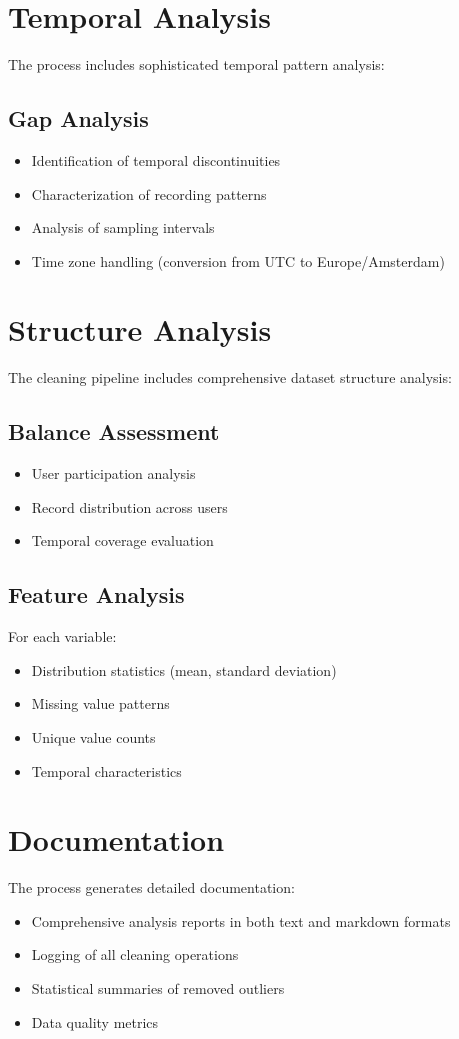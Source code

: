 \documentclass{article}
\begin{document}
\section{Temporal Analysis}
The process includes sophisticated temporal pattern analysis:

\subsection{Gap Analysis}
\begin{itemize}[noitemsep]
\item Identification of temporal discontinuities
\item Characterization of recording patterns
\item Analysis of sampling intervals
\item Time zone handling (conversion from UTC to Europe/Amsterdam)
\end{itemize}

\section{Structure Analysis}
The cleaning pipeline includes comprehensive dataset structure analysis:

\subsection{Balance Assessment}
\begin{itemize}[noitemsep]
\item User participation analysis
\item Record distribution across users
\item Temporal coverage evaluation
\end{itemize}

\subsection{Feature Analysis}
For each variable:
\begin{itemize}[noitemsep]
\item Distribution statistics (mean, standard deviation)
\item Missing value patterns
\item Unique value counts
\item Temporal characteristics
\end{itemize}

\section{Documentation}
The process generates detailed documentation:
\begin{itemize}[noitemsep]
\item Comprehensive analysis reports in both text and markdown formats
\item Logging of all cleaning operations
\item Statistical summaries of removed outliers
\item Data quality metrics
\end{itemize}
\end{document}
